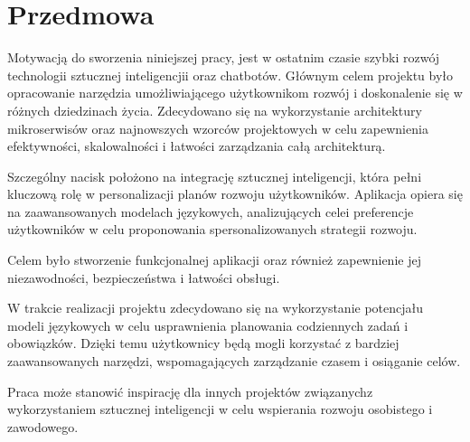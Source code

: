 \section{Przedmowa}

\indent Motywacją do sworzenia niniejszej pracy, jest w ostatnim czasie szybki rozwój technologii sztucznej inteligencjii oraz chatbotów. Głównym celem  projektu było opracowanie narzędzia umożliwiającego użytkownikom rozwój i doskonalenie się w różnych dziedzinach życia. Zdecydowano się na wykorzystanie architektury mikroserwisów oraz najnowszych wzorców projektowych w celu zapewnienia efektywności, skalowalności i łatwości zarządzania całą architekturą.

Szczególny nacisk położono na integrację sztucznej inteligencji, która pełni kluczową rolę w personalizacji planów rozwoju użytkowników. Aplikacja opiera się na zaawansowanych modelach językowych, analizujących cele\linebreak i preferencje użytkowników w celu proponowania spersonalizowanych strategii rozwoju.

Celem było stworzenie funkcjonalnej aplikacji oraz również zapewnienie jej niezawodności, bezpieczeństwa i łatwości obsługi.

W trakcie realizacji projektu zdecydowano się na wykorzystanie potencjału modeli językowych w celu usprawnienia planowania codziennych zadań i obowiązków. Dzięki temu użytkownicy będą mogli korzystać z bardziej zaawansowanych narzędzi, wspomagających zarządzanie czasem i osiąganie celów.

Praca może stanowić inspirację dla innych projektów związanych\linebreak z wykorzystaniem sztucznej inteligencji w celu wspierania rozwoju osobistego i zawodowego.